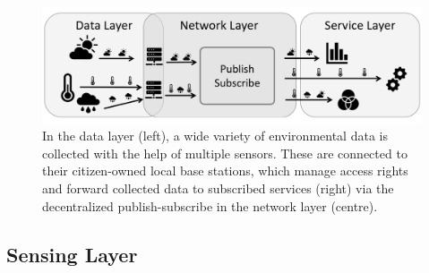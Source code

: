 \begin{figure}[h]
    \centering
    \includegraphics[width=\textwidth]{images/expose-system-architecture.png}
    \caption{In the data layer (left), a wide variety of environmental data is collected with the help of multiple sensors. These are connected to their citizen-owned local base stations, which manage access rights and forward collected data to subscribed services (right) via the decentralized publish-subscribe in the network layer (centre).}
    \label{fig:system-architecture-overview}
\end{figure}

\subsection{Sensing Layer}

